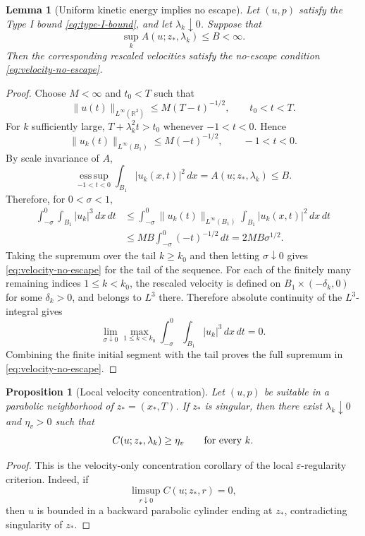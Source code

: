 \documentclass[11pt]{amsart}
\theoremstyle{plain}
\newtheorem{proposition}[theorem]{Proposition}
\newtheorem{lemma}[theorem]{Lemma}
\theoremstyle{definition}
\theoremstyle{remark}
\numberwithin{equation}{section}
\newcommand{\R}{\mathbb R}
\newcommand{\esssup}{\operatorname*{ess\,sup}}
\begin{document}
\begin{lemma}[Uniform kinetic energy implies no escape]
\label{lem:A-seq-no-escape}
Let \((u,p)\) satisfy the Type I bound \eqref{eq:type-I-bound}, and let
\(\lambda_k\downarrow0\).  Suppose that
\[
   \sup_k A(u;z_*,\lambda_k)\le B<\infty .
\]
Then the corresponding rescaled velocities satisfy the no-escape condition
\eqref{eq:velocity-no-escape}.
\end{lemma}

\begin{proof}
Choose \(M<\infty\) and \(t_0<T\) such that
\[
   \|u(t)\|_{L^\infty(\R^3)}
   \le M(T-t)^{-1/2},
   \qquad t_0<t<T.
\]
For \(k\) sufficiently large, \(T+\lambda_k^2t>t_0\) whenever
\(-1<t<0\).  Hence
\[
   \|u_k(t)\|_{L^\infty(B_1)}
   \le M(-t)^{-1/2},\qquad -1<t<0.
\]
By scale invariance of \(A\),
\[
   \esssup_{-1<t<0}\int_{B_1}|u_k(x,t)|^2\,dx
   =
   A(u;z_*,\lambda_k)\le B.
\]
Therefore, for \(0<\sigma<1\),
\[
\begin{aligned}
   \int_{-\sigma}^{0}\int_{B_1}|u_k|^3\,dx\,dt
   &\le
   \int_{-\sigma}^{0}
   \|u_k(t)\|_{L^\infty(B_1)}
   \int_{B_1}|u_k(x,t)|^2\,dx\,dt  \\
   &\le MB\int_{-\sigma}^{0}(-t)^{-1/2}\,dt
    =2MB\sigma^{1/2}.
\end{aligned}
\]
Taking the supremum over the tail \(k\ge k_0\) and then letting
\(\sigma\downarrow0\) gives \eqref{eq:velocity-no-escape} for the tail of the
sequence.  For each of the finitely many remaining indices
\(1\le k<k_0\), the rescaled velocity is defined on
\(B_1\times(-\delta_k,0)\) for some \(\delta_k>0\), and belongs to
\(L^3\) there.  Therefore absolute continuity of the \(L^3\)-integral gives
\[
   \lim_{\sigma\downarrow0}
   \max_{1\le k<k_0}
   \int_{-\sigma}^{0}\int_{B_1}|u_k|^3\,dx\,dt=0.
\]
Combining the finite initial segment with the tail proves the full supremum
in \eqref{eq:velocity-no-escape}.
\end{proof}

\begin{proposition}[Local velocity concentration]
\label{prop:local-velocity-concentration}
Let \((u,p)\) be suitable in a parabolic neighborhood of
\(z_*=(x_*,T)\).  If \(z_*\) is singular, then there exist
\(\lambda_k\downarrow0\) and \(\eta_v>0\) such that
\[
   C(u;z_*,\lambda_k)\ge\eta_v
   \qquad\hbox{for every }k.
\]
\end{proposition}

\begin{proof}
This is the velocity-only concentration corollary of the local
\(\varepsilon\)-regularity criterion.  Indeed, if
\[
   \limsup_{r\downarrow0}C(u;z_*,r)=0,
\]
then \(u\) is bounded in a backward parabolic cylinder ending at \(z_*\),
contradicting singularity of \(z_*\).
\end{proof}
\end{document}
